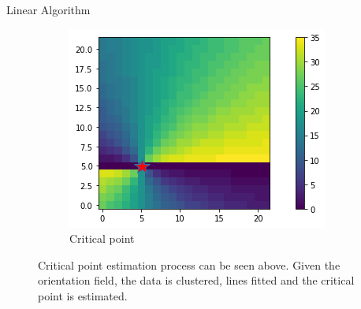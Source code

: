 \documentclass{beamer}
\begin{document}
\begin{frame}{Linear Algorithm}
\begin{figure}[h]
\begin{subfigure}[t]{.3\textwidth}
       	\end{subfigure}\hfill%
       	\begin{subfigure}[t]{.3\textwidth}
       		\centering
       		\includegraphics[width=0.6\linewidth]{images/crit_estp1_loc.png}
       		\caption{Critical point}
       	
       	\end{subfigure}
       	
       	\caption{Critical point estimation process can be seen above. Given the orientation field, the data is clustered, lines fitted and the critical point is estimated.}
       	\label{crit_steps}
       \end{figure}
    
\end{frame}
\end{document}
